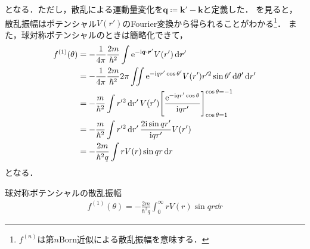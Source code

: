 \documentclass{report}
\begin{document}
  となる．ただし，散乱による運動量変化を$\bm{q}\coloneqq \bm{k}' - \bm{k}$と定義した．
  を見ると，散乱振幅はポテンシャル$V(r')$のFourier変換から得られることがわかる\footnote{
    $f^{(n)}$は第$n$Born近似による散乱振幅を意味する．}．
  また，球対称ポテンシャルのときは簡略化できて，
  \begin{align}
    f^{(1)}(\theta) &= -\frac{1}{4\pi}\frac{2m}{\hbar^2}\int\mathrm{e}^{-\mathrm{i} \bm{q}\cdot \bm{r}'} V(r') \dd{\bm{r}'}\\
    &= -\frac{1}{4\pi}\frac{2m}{\hbar^2} 2\pi \iint \mathrm{e}^{-\mathrm{i} qr' \cos\theta'} V(r') r'^2 \sin\theta' \dd{\theta'} \dd{r'}\\
    &= -\frac{m}{\hbar^2} \int r'^2 \dd{r'} V(r') \qty[\frac{\mathrm{e}^{-\mathrm{i} qr' \cos\theta}}{\mathrm{i} qr'}]^{\cos\theta = -1}_{\cos\theta =1}\\
    &= -\frac{m}{\hbar^2} \int r'^2 \dd{r'} \frac{2\mathrm{i} \sin qr'}{\mathrm{i} qr'}V(r')\\
    &= -\frac{2m}{\hbar^2 q} \int rV(r)\sin qr \dd{r}
  \end{align}
  となる．
 \begin{itembox}[l]{球対称ポテンシャルの散乱振幅}
  \begin{align}
    \label{SCamp1st}
    f^{(1)}(\theta) =  -\frac{2m}{\hbar^2 q} \int_{0}^{\infty} rV(r)\sin qr \dd{r}
  \end{align}
 \end{itembox} 
\end{document}
